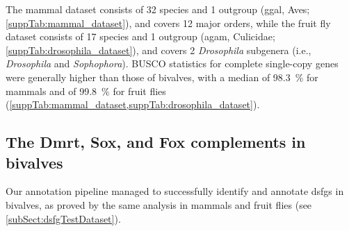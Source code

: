 The mammal dataset consists of 32 species and 1 outgroup (\gls{ggal}, Aves; \cref{suppTab:mammal_dataset}), and covers 12 major orders, while the fruit fly dataset consists of 17 species and 1 outgroup (\gls{agam}, Culicidae; \cref{suppTab:drosophila_dataset}), and covers 2 \textit{Drosophila} subgenera (i.e., \textit{Drosophila} and \textit{Sophophora}). BUSCO statistics for complete single-copy genes were generally higher than those of bivalves, with a median of \qty{98.3}{\percent} for mammals and of \qty{99.8}{\percent} for fruit flies (\cref{suppTab:mammal_dataset,suppTab:drosophila_dataset}).

\subsection{The Dmrt, Sox, and Fox complements in bivalves}
Our annotation pipeline managed to successfully identify and annotate \glspl{dsfg} in bivalves, as proved by the same analysis in mammals and fruit flies (see \cref{subSect:dsfgTestDataset}).


